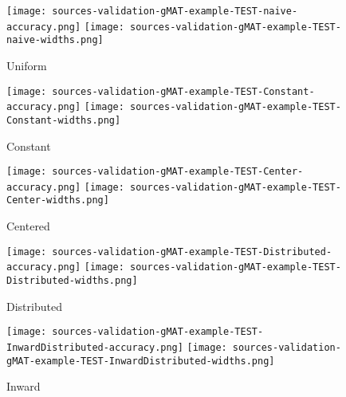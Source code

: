 \documentclass[3p,10pt,times]{elsarticle}
\theoremstyle{definition}
\newcommand{\stkout}[1]{\ifmmode\text{\st{\ensuremath{#1}}}\else\sout{#1}\fi}
\newcommand{\revise}[2]{\noindent{\color{red}{\stkout{#1}}}{\color{blue}{#2}}}
\numberwithin{question}{section}
\newlength{\figwidth}
\newlength{\figheight}
\newcommand{\noimage}[1]{%
	  \setlength{\fboxsep}{-\fboxrule}%
	  \fbox{\phantom{\rule{10pt}{10pt}} Missing file: \path{#1} \phantom{\rule{10pt}{10pt}}}%
	}
\let\includegraphicsoriginal\includegraphics
\renewcommand{\includegraphics}[2][width=\textwidth]{\IfFileExists{#2}{\includegraphicsoriginal[#1]{#2}}{\noimage{#2}}}
\begin{document}
\begin{figure*}
\centering
\setlength{\figwidth}{0.19\textwidth}
\setlength{\figheight}{0.283\textwidth}
\begin{subfigure}{\figwidth}\centering
\texttt{[image: sources-validation-gMAT-example-TEST-naive-accuracy.png]}
\texttt{[image: sources-validation-gMAT-example-TEST-naive-widths.png]}
\caption{Uniform}\label{TEST_naive_accuracy}
\end{subfigure}
\begin{subfigure}{\figwidth}\centering
\texttt{[image: sources-validation-gMAT-example-TEST-Constant-accuracy.png]}
\texttt{[image: sources-validation-gMAT-example-TEST-Constant-widths.png]}
\caption{Constant}\label{TEST_Constant_accuracy}
\end{subfigure}
\begin{subfigure}{\figwidth}\centering
\texttt{[image: sources-validation-gMAT-example-TEST-Center-accuracy.png]}
\texttt{[image: sources-validation-gMAT-example-TEST-Center-widths.png]}
\caption{Centered}\label{TEST_Center_accuracy}
\end{subfigure}
\begin{subfigure}{\figwidth}\centering
\texttt{[image: sources-validation-gMAT-example-TEST-Distributed-accuracy.png]}
\texttt{[image: sources-validation-gMAT-example-TEST-Distributed-widths.png]}
\caption{Distributed}\label{TEST_Distributed_accuracy}
\end{subfigure}
\begin{subfigure}{\figwidth}\centering
\texttt{[image: sources-validation-gMAT-example-TEST-InwardDistributed-accuracy.png]}
\texttt{[image: sources-validation-gMAT-example-TEST-InwardDistributed-widths.png]}
\caption{Inward \revise{}{($N=2$)}}\label{TEST_InwardDistributed_accuracy}
\end{subfigure}

\end{figure*}
\end{document}
